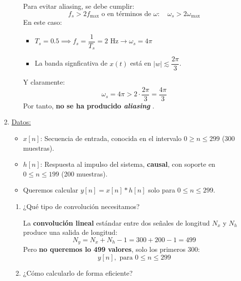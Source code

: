 \begin{enumerate}[label=\color{red}\textbf{\alph*)}]
\begin{enumerate}[label=Paso \arabic*:]
                 Para evitar aliasing, se debe cumplir: \[
                 f_s>2f_{\max} \text{ o en términos de }\omega:\quad \omega_s>2\omega_{\max}
                 \] 
                 En este caso:
                 \begin{itemize}[label=\textbullet]
                     \item $T_s=0.5\implies f_s=\dfrac{1}{T_s}=2\text{ Hz}\to \omega_s=4\pi$ 
                     \item La banda signficativa de $x(t)$ está en  $|w|\lesssim \dfrac{2\pi}{3}$.
                 \end{itemize}
                 Y claramente: \[
                 \omega_s=4\pi>2\cdot \dfrac{2\pi}{3}=\dfrac{4\pi}{3}
                 \] 
                 Por tanto, \textbf{no se ha producido \textit{aliasing} }. 
         \end{enumerate}
	\item {}

        \underline{Datos:}
        \begin{itemize}[label=\textbullet]
            \item $x[n]$: Secuencia de entrada, conocida en el intervalo  $0\ge n\le 299$ (300 muestras).
            \item $h[n]$: Respuesta al impulso del sistema,  \textbf{causal}, con soporte en $0\le n\le 199$ (200 muestras).
            \item Queremos calcular $y[n]=x[n]\ast h[n]$ solo para  $0\le n\le 299$.
        \end{itemize}
        \begin{enumerate}[label=Paso \arabic*:]
            \item ¿Qué tipo de convolución necesitamos?

                La \textbf{convolución lineal} estándar entre dos señales de longitud $N_x$ y  $N_h$ produce una salida de longitud:  \[
                N_y=N_x+N_h-1=300+200-1=499
                \]  
                Pero \textbf{no queremos lo 499 valores}, solo los primeros 300: \[
                    y[n],\text{ para } 0\le n\le 299
                \]  
            \item ¿Cómo calcularlo de forma eficiente?


\end{enumerate}
\end{enumerate}
